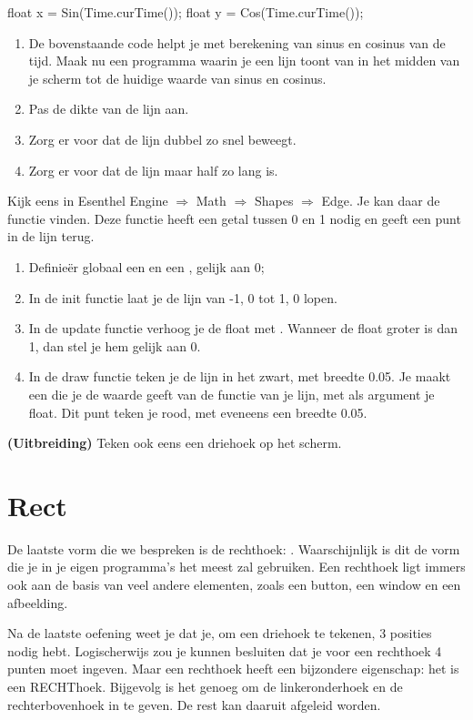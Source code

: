 \begin{code}
float x = Sin(Time.curTime());
float y = Cos(Time.curTime());
\end{code}

\begin{enumerate}
\item De bovenstaande code helpt je met berekening van sinus en cosinus van de tijd. Maak nu een programma waarin je een lijn toont van in het midden van je scherm tot de huidige waarde van sinus en cosinus.
\item Pas de dikte van de lijn aan.
\item Zorg er voor dat de lijn dubbel zo snel beweegt.
\item Zorg er voor dat de lijn maar half zo lang is.
\end{enumerate}

Kijk eens in Esenthel Engine $\Rightarrow$ Math $\Rightarrow$ Shapes $\Rightarrow$ Edge. Je kan daar de functie  vinden. Deze functie heeft een getal tussen 0 en 1 nodig en geeft een punt in de lijn terug.

\begin{enumerate}
\item Definie\"er globaal een  en een , gelijk aan 0;
\item In de init functie laat je de lijn van -1, 0 tot 1, 0 lopen.
\item In de update functie verhoog je de float met . Wanneer de float groter is dan 1, dan stel je hem gelijk aan 0.
\item In de draw functie teken je de lijn in het zwart, met breedte 0.05. Je maakt een  die je de waarde geeft van de  functie van je lijn, met als argument je float. Dit punt teken je rood, met eveneens een breedte 0.05.
\end{enumerate}

\textbf{(Uitbreiding)} Teken ook eens een driehoek op het scherm.

\section{Rect}
De laatste vorm die we bespreken is de rechthoek: . Waarschijnlijk is dit de vorm die je in je eigen programma's het meest zal gebruiken. Een rechthoek ligt immers ook aan de basis van veel andere elementen, zoals een button, een window en een afbeelding.

Na de laatste oefening weet je dat je, om een driehoek te tekenen, 3 posities nodig hebt. Logischerwijs zou je kunnen besluiten dat je voor een rechthoek 4 punten moet ingeven. Maar een rechthoek heeft een bijzondere eigenschap: het is een RECHThoek. Bijgevolg is het genoeg om de linkeronderhoek en de rechterbovenhoek in te geven. De rest kan daaruit afgeleid worden.

